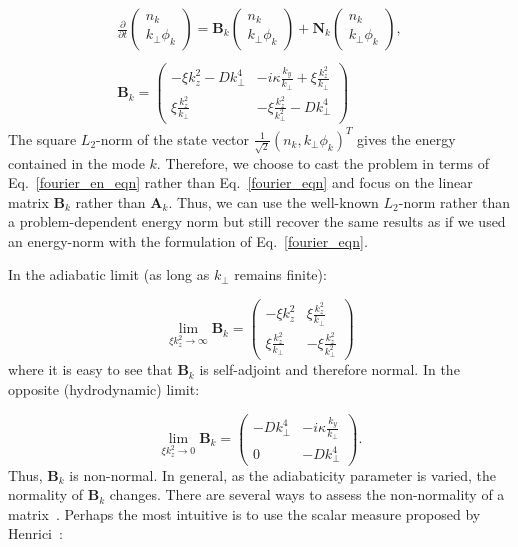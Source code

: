 \documentclass[twocolumn,showkeys,superscriptaddress]{revtex4}
\def\beq{\begin{equation}}
\def\eeq{\end{equation}}
\def\beqar{\begin{eqnarray}}
\def\eeqar{\end{eqnarray}}
\begin{document}
\beqar
\label{fourier_en_eqn}
\frac{\partial}{\partial t} \left( \begin{array}{cc} n_k \\ k_\perp \phi_k \end{array} \right) = \mathbf{B}_k \left( \begin{array}{cc} n_k \\ k_\perp \phi_k \end{array} \right) + \mathbf{N}_k \left( \begin{array}{cc} n_k \\ k_\perp \phi_k \end{array} \right), \\ \nonumber \\
\label{B_k}
\mathbf{B}_k = \left( \begin{array}{cc} -\xi k_z^2 - D k_\perp^4 & -i \kappa \frac{k_y}{k_\perp} + \xi \frac{k_z^2}{k_\perp} \\  \xi \frac{k_z^2}{k_\perp} & - \xi \frac{k_z^2}{k_\perp^2} - D k_\perp^4\end{array} \right)
\eeqar
The square $L_2$-norm of the state vector $\frac{1}{\sqrt{2}} \left( n_k , k_\perp \phi_k \right)^T$ gives the energy contained in the mode $k$.
Therefore, we choose to cast the problem in terms of Eq.~\ref{fourier_en_eqn} rather than Eq.~\ref{fourier_eqn} and focus on the linear matrix $\mathbf{B}_k$ rather than $\mathbf{A}_k$. Thus, we can use
the well-known $L_2$-norm rather than a problem-dependent energy norm but still recover the same results as if we used an energy-norm with the formulation of Eq.~\ref{fourier_eqn}.

In the adiabatic limit (as long as $k_\perp$ remains finite):

\beq
\label{B_norm_limit}
\displaystyle\lim_{\xi k_z^2 \to \infty} \mathbf{B}_k = \left( \begin{array}{cc} -\xi k_z^2 & \xi \frac{k_z^2}{k_\perp} \\  \xi \frac{k_z^2}{k_\perp} & - \xi \frac{k_z^2}{k_\perp^2} \end{array} \right)
\eeq
where it is easy to see that $\mathbf{B}_k$ is self-adjoint and therefore normal. In the opposite (hydrodynamic) limit:

\beq
\label{B_norm_limit0}
\displaystyle\lim_{\xi k_z^2 \to 0} \mathbf{B}_k = \left( \begin{array}{cc} - D k_\perp^4 & -i \kappa \frac{k_y}{k_\perp} \\ 0  & - D k_\perp^4\end{array} \right).
\eeq
Thus, $\mathbf{B}_k$ is non-normal. In general, as the adiabaticity parameter is varied, the normality of $\mathbf{B}_k$ changes. There are several ways to assess the non-normality of a matrix~\cite{trefethen2005}.
Perhaps the most intuitive is to use the scalar measure proposed by Henrici~\cite{henrici1962}:
\end{document}
